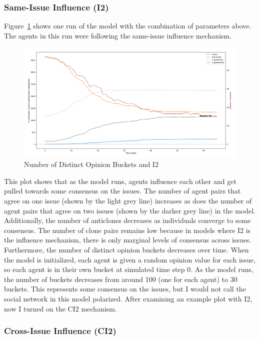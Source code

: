 \subsubsection{Same-Issue Influence (I2)}

Figure~\ref{H3_census_I2} shows one run of the model with the combination of parameters above. The agents in this run were following the same-issue influence mechanism. 

\begin{figure}
\centering
\includegraphics[width=1.0\columnwidth]{./Graphs/census3I2.png}
\caption{Number of Distinct Opinion Buckets and I2}
\label{H3_census_I2}
\end{figure}

This plot shows that as the model runs, agents influence each other and get pulled towards some consensus on the issues. The number of agent pairs that agree on one issue (shown by the light grey line) increases as does the number of agent pairs that agree on two issues (shown by the darker grey line) in the model. Additionally, the number of anticlones decreases as individuals converge to some consensus. The number of clone pairs remains low because in models where I2 is the influence mechanism, there is only marginal levels of consensus across issues. Furthermore, the number of distinct opinion buckets decreases over time. When the model is initialized, each agent is given a random opinion value for each issue, so each agent is in their own bucket at simulated time step 0. As the model runs, the number of buckets decreases from around 100 (one for each agent) to 30 buckets. This represents some consensus on the issues, but I would not call the social network in this model polarized. After examining an example plot with I2, now I turned on the CI2 mechanism.

\subsubsection{Cross-Issue Influence (CI2)}

